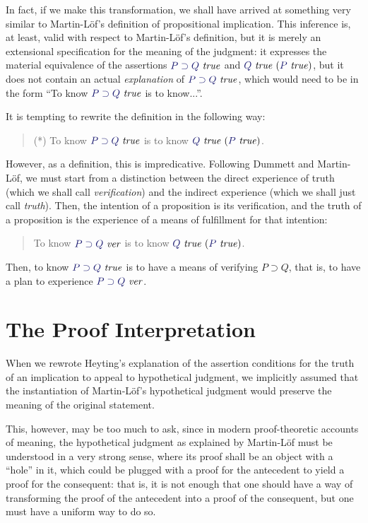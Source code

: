 \documentclass[11pt]{amsart}
\theoremstyle{definition}
\theoremstyle{remark}
\numberwithin{equation}{section}
\def\InputModeColorName{MidnightBlue}
\newcommand\InputMode[1]{{\color{\InputModeColorName}{#1}}}
\newcommand\HypJ[2]{#1\ (#2)}
\newcommand\IsVer[1]{\InputMode{#1}\ \mathit{ver}}
\newcommand\IsTrue[1]{\InputMode{#1}\ \mathit{true}}
\newcommand\Imp[2]{#1\supset #2}
\begin{document}
In fact, if we make this transformation, we shall have arrived at something very
similar to Martin-L\"of's definition of propositional implication. This
inference is, at least, valid with respect to Martin-L\"of's definition, but it
is merely an extensional specification for the meaning of the judgment: it
expresses the material equivalence of the assertions $\IsTrue{\Imp{P}{Q}}$ and
$\HypJ{\IsTrue{Q}}{\IsTrue{P}}$, but it does not contain an actual
\emph{explanation} of $\IsTrue{\Imp{P}{Q}}$, which would need to be in the form ``To
know $\IsTrue{\Imp{P}{Q}}$ is to know...''.

It is tempting to rewrite the definition in the following way:
\begin{quote}
  (*) To know $\IsTrue{\Imp{P}{Q}}$ is to know $\HypJ{\IsTrue{Q}}{\IsTrue{P}}$.
\end{quote}

However, as a definition, this is impredicative. Following Dummett
\cite{Dummett:Elements} and Martin-L\"of, we must start from a distinction
between the direct experience of truth (which we shall call \emph{verification})
and the indirect experience (which we shall just call \emph{truth}). Then, the
intention of a proposition is its verification, and the truth of a proposition
is the experience of a means of fulfillment for that intention:

\begin{quote}
  To know $\IsVer{\Imp{P}{Q}}$ is to know $\HypJ{\IsTrue{Q}}{\IsTrue{P}}$.
\end{quote}

Then, to know $\IsTrue{\Imp{P}{Q}}$ is to have a means of verifying $\Imp{P}{Q}$, that
is, to have a plan to experience $\IsVer{\Imp{P}{Q}}$.

\section{The Proof Interpretation}

When we rewrote Heyting's explanation of the assertion conditions for the truth
of an implication to appeal to hypothetical judgment, we implicitly assumed that
the instantiation of Martin-L\"of's hypothetical judgment would preserve the
meaning of the original statement.

This, however, may be too much to ask, since in modern proof-theoretic accounts
of meaning, the hypothetical judgment as explained by Martin-L\"of must be
understood in a very strong sense, where its proof shall be an object with a
``hole'' in it, which could be plugged with a proof for the antecedent to yield
a proof for the consequent: that is, it is not enough that one should have a way
of transforming the proof of the antecedent into a proof of the consequent, but
one must have a uniform way to do so.
\end{document}
